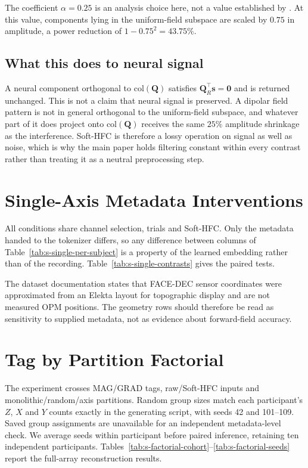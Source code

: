 The coefficient $\alpha = 0.25$ is an analysis choice here, not a value established by \citet{tierney2021hfc}. At this value, components lying in the uniform-field subspace
are scaled by $0.75$ in amplitude, a power reduction of $1 - 0.75^{2} = 43.75\%$.

\subsection{What this does to neural signal}
A neural component orthogonal to $\mathrm{col}(\mathbf{Q})$ satisfies
$\mathbf{Q}_{R}^{\top}\mathbf{s} = \mathbf{0}$ and is returned unchanged. This is not a
claim that neural signal is preserved. A dipolar field pattern is not in general
orthogonal to the uniform-field subspace, and whatever part of it does project onto
$\mathrm{col}(\mathbf{Q})$ receives the same $25\%$ amplitude shrinkage as the
interference. Soft-HFC is therefore a lossy operation on signal as well as noise,
which is why the main paper holds filtering constant within every contrast rather
than treating it as a neutral preprocessing step.

\section{Single-Axis Metadata Interventions}

All conditions share channel selection, trials and Soft-HFC. Only the metadata handed
to the tokenizer differs, so any difference between columns of
Table~\ref{tab:s-single-per-subject} is a property of the learned embedding rather than
of the recording. Table~\ref{tab:s-single-contrasts} gives the paired tests.

The dataset documentation states that FACE-DEC sensor coordinates were approximated
from an Elekta layout for topographic display and are not measured OPM positions. The
geometry rows should therefore be read as sensitivity to supplied metadata, not as
evidence about forward-field accuracy.

\section{Tag by Partition Factorial}
The experiment crosses MAG/GRAD tags, raw/Soft-HFC inputs and monolithic/random/axis partitions. Random group sizes match each participant's $Z$, $X$ and $Y$ counts exactly in the generating script, with seeds 42 and 101--109. Saved group assignments are unavailable for an independent metadata-level check. We average seeds within participant before paired inference, retaining ten independent participants. Tables~\ref{tab:s-factorial-cohort}--\ref{tab:s-factorial-seeds} report the full-array reconstruction results.

